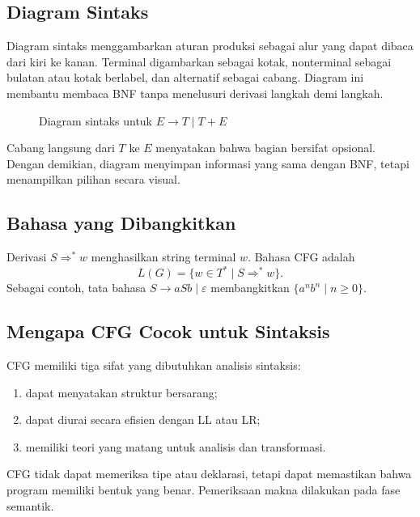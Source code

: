\subsection{Diagram Sintaks}

Diagram sintaks menggambarkan aturan produksi sebagai alur yang dapat
dibaca dari kiri ke kanan. Terminal digambarkan sebagai kotak,
nonterminal sebagai bulatan atau kotak berlabel, dan alternatif
sebagai cabang. Diagram ini membantu membaca BNF tanpa menelusuri
derivasi langkah demi langkah.

\begin{figure}[H]
\centering
{}
\caption{Diagram sintaks untuk \(E \to T \mid T + E\)}
\label{fig:ch08-diagram}
\end{figure}

Cabang langsung dari \(T\) ke \(E\) menyatakan bahwa bagian
 bersifat opsional. Dengan demikian, diagram menyimpan
informasi yang sama dengan BNF, tetapi menampilkan pilihan secara
visual.

\subsection{Bahasa yang Dibangkitkan}

Derivasi \(S \Rightarrow^{*} w\) menghasilkan string terminal \(w\).
Bahasa CFG adalah
\[
L(G) = \{w \in T^{*} \mid S \Rightarrow^{*} w\}.
\]
Sebagai contoh, tata bahasa
\(S \to aSb \mid \varepsilon\) membangkitkan
\(\{a^n b^n \mid n \ge 0\}\).

\subsection{Mengapa CFG Cocok untuk Sintaksis}

CFG memiliki tiga sifat yang dibutuhkan analisis sintaksis:
\begin{enumerate}[label=\arabic*.,leftmargin=*]
  \item dapat menyatakan struktur bersarang;
  \item dapat diurai secara efisien dengan LL atau LR;
  \item memiliki teori yang matang untuk analisis dan transformasi.
\end{enumerate}

CFG tidak dapat memeriksa tipe atau deklarasi, tetapi dapat memastikan
bahwa program memiliki bentuk yang benar. Pemeriksaan makna
dilakukan pada fase semantik.
